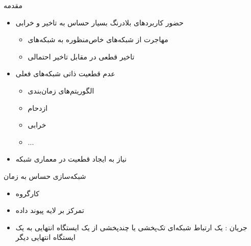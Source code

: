 \documentclass[dvipsnames]{beamer}
\makeatletter
\newcommand{\RTList}{\raggedleft\rightskip\@totalleftmargin}
\makeatother
\begin{document}
\begin{persian}
	\begin{frame}{مقدمه}
		\begin{itemize}\RTList{}
			\justifying%
			\item حضور کاربردهای بلادرنگ بسیار حساس به تاخیر و خرابی
			\begin{itemize}\RTList{}
			  	\item مهاجرت از شبکه‌های خاص‌منظوره به شبکه‌های 
				\item تاخیر قطعی در مقابل تاخیر احتمالی
			\end{itemize}
			\item عدم قطعیت ذاتی شبکه‌های فعلی
			\begin{itemize}\RTList{}
				\item الگوریتم‌های زمان‌بندی
				\item ازدحام
				\item خرابی
				\item ...
			\end{itemize}
			\item نیاز به ایجاد قطعیت در معماری شبکه
		\end{itemize}
	\end{frame}

	\begin{frame}{شبکه‌‌سازی حساس به زمان }
		\begin{itemize}\RTList{}
			\justifying%
			\item کارگروه 
			\item تمرکز بر لایه پیوند داده
			\item جریان : یک ارتباط شبکه‌ای تک‌پخشی یا چند‌پخشی از یک ایستگاه انتهایی به یک ایستگاه انتهایی دیگر
			\begin{itemize}\end{itemize}
		\end{itemize}
	\end{frame}


\end{persian}
\end{document}
